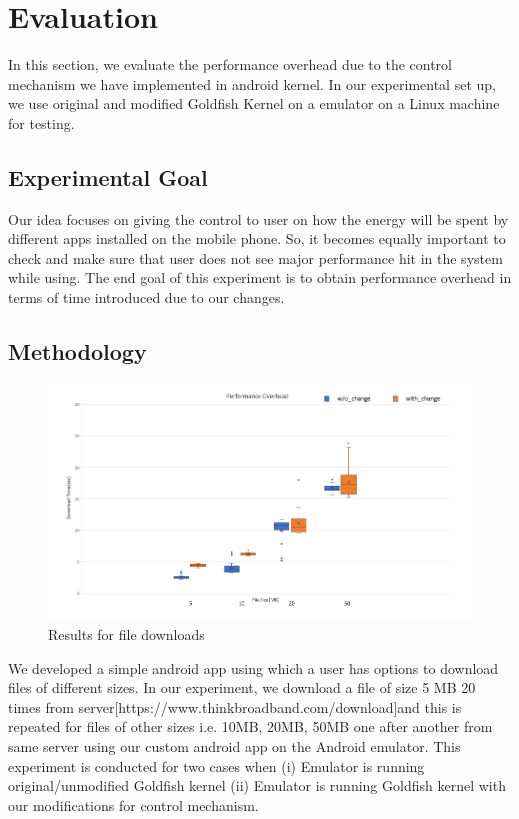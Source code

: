 \section{Evaluation}\label{evaluation}
In this section, we evaluate the performance overhead due to the control mechanism we have implemented in android kernel. In our experimental set up, we use original  and modified Goldfish Kernel on a emulator on a Linux machine for testing. 

\subsection{Experimental Goal}
Our idea focuses on  giving the control to  user on how the energy will be spent by different apps installed on the mobile phone. So, it becomes equally important to check and make sure that user does not see major performance hit in the system while using. The end goal of this experiment is to obtain performance overhead in terms of time introduced due to our changes.


\subsection{Methodology}
\begin{figure}[t]
	\centering
	\includegraphics[width=\linewidth]{Figs/boxplot}
	\caption{Results for file downloads}
	\label{fig:result}
	\centering
\end{figure}

We developed a simple android app using which a user has options to download files of different sizes. In our experiment, we download a file of size 5 MB 20 times from server[https://www.thinkbroadband.com/download]and this is repeated for files of other sizes i.e. 10MB, 20MB, 50MB one after another from same server using our custom android app on the Android emulator. This experiment is conducted for two cases when (i) Emulator is running original/unmodified Goldfish kernel  (ii) Emulator is running Goldfish kernel with our modifications for control mechanism. 

